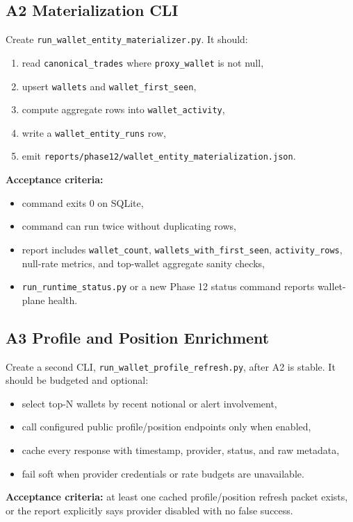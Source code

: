 \documentclass{article}
\begin{document}
\subsection*{A2 Materialization CLI}
Create \texttt{run\_wallet\_entity\_materializer.py}. It should:
\begin{enumerate}[nosep]
\item read \texttt{canonical\_trades} where \texttt{proxy\_wallet} is not null,
\item upsert \texttt{wallets} and \texttt{wallet\_first\_seen},
\item compute aggregate rows into \texttt{wallet\_activity},
\item write a \texttt{wallet\_entity\_runs} row,
\item emit \texttt{reports/phase12/wallet\_entity\_materialization.json}.
\end{enumerate}

\textbf{Acceptance criteria:}
\begin{itemize}[nosep]
\item command exits 0 on SQLite,
\item command can run twice without duplicating rows,
\item report includes \texttt{wallet\_count}, \texttt{wallets\_with\_first\_seen}, \texttt{activity\_rows}, null-rate metrics, and top-wallet aggregate sanity checks,
\item \texttt{run\_runtime\_status.py} or a new Phase 12 status command reports wallet-plane health.
\end{itemize}

\subsection*{A3 Profile and Position Enrichment}
Create a second CLI, \texttt{run\_wallet\_profile\_refresh.py}, after A2 is stable. It should be budgeted and optional:
\begin{itemize}[nosep]
\item select top-N wallets by recent notional or alert involvement,
\item call configured public profile/position endpoints only when enabled,
\item cache every response with timestamp, provider, status, and raw metadata,
\item fail soft when provider credentials or rate budgets are unavailable.
\end{itemize}

\textbf{Acceptance criteria:} at least one cached profile/position refresh packet exists, or the report explicitly says provider disabled with no false success.
\end{document}
